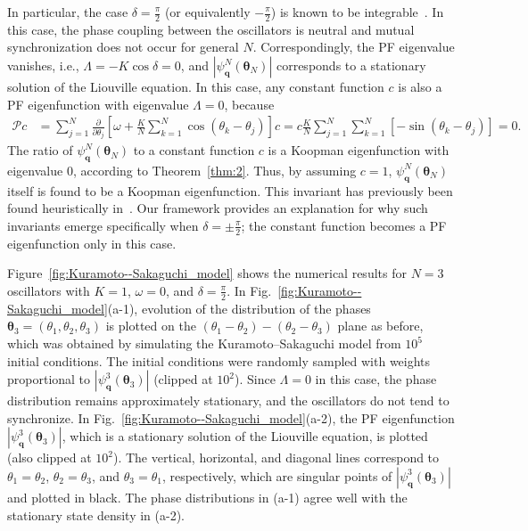 \documentclass[
amsmath,amssymb,
]{revtex4-2}
\begin{document}
In particular, the case $\delta = \frac{\pi}{2}$ (or equivalently $-\frac{\pi}{2}$) is known to be integrable~\cite{Watanabe1993integrability}.
%
In this case, the phase coupling between the oscillators is neutral and mutual synchronization does not occur for general $N$.
%
Correspondingly, the PF eigenvalue vanishes, i.e., $\Lambda = - K \cos \delta = 0$, and $\left|\psi^N_{\bm{q}}({\bm \theta}_N)\right|$ corresponds to a stationary solution of the Liouville equation.
%
In this case, any constant function $c$ is also a PF eigenfunction with eigenvalue $\Lambda = 0$, because
%
\begin{align}
    \mathcal{P}c &= \sum_{j=1}^N\frac{\partial}{\partial\theta_j} \left[\omega+\frac{K}{N}\sum_{k=1}^N\cos(\theta_k-\theta_j)\right] c 
    = c \frac{K}{N}\sum_{j=1}^N\sum_{k=1}^N[-\sin(\theta_k-\theta_j)]=0.
\end{align}
%
The ratio of $\psi^N_{\bm{q}}({\bm \theta}_N)$ to a constant function $c$ is a Koopman eigenfunction with eigenvalue $0$, according to Theorem~\ref{thm:2}.
Thus, by assuming $c=1$, $\psi^N_{\bm{q}}({\bm \theta}_N)$ itself is found to be a Koopman eigenfunction.
%
This invariant has previously been found heuristically in~\cite{Watanabe1993integrability}. Our framework provides an explanation for why such invariants emerge specifically when $\delta = \pm \frac{\pi}{2}$; the constant function becomes a PF eigenfunction only in this case.

Figure~\ref{fig:Kuramoto--Sakaguchi_model} shows the numerical results for $N=3$ oscillators with $K = 1$, $\omega = 0$, and $\delta = \frac{\pi}{2}$.
%
In Fig.~\ref{fig:Kuramoto--Sakaguchi_model}(a-1), evolution of the distribution of the phases ${\bm \theta}_3 = (\theta_1, \theta_2, \theta_3)$ is plotted on the $(\theta_1-\theta_2) - (\theta_2-\theta_3)$ plane as before, which was obtained by simulating the Kuramoto--Sakaguchi model from $10^5$ initial conditions.
%
The initial conditions were randomly sampled with weights proportional to $\left|\psi^3_{\bm{q}}({\bm \theta}_3)\right|$ (clipped at $10^2$).
%
Since $\Lambda = 0$ in this case, the phase distribution remains approximately stationary, and the oscillators do not tend to synchronize.
%
In Fig.~\ref{fig:Kuramoto--Sakaguchi_model}(a-2), the PF eigenfunction $|\psi^3_{\bm{q}}({\bm \theta}_3)|$, which is a stationary solution of the Liouville equation, is plotted (also clipped at $10^2$).
%
The vertical, horizontal, and diagonal lines correspond to $\theta_1 = \theta_2$, $\theta_2 = \theta_3$, and $\theta_3 = \theta_1$, respectively, which are singular points of $\left|\psi^3_{\bm{q}}({\bm \theta}_3)\right|$ and plotted in black.
%
The phase distributions in (a-1) agree well with the stationary state density in (a-2).
\end{document}
